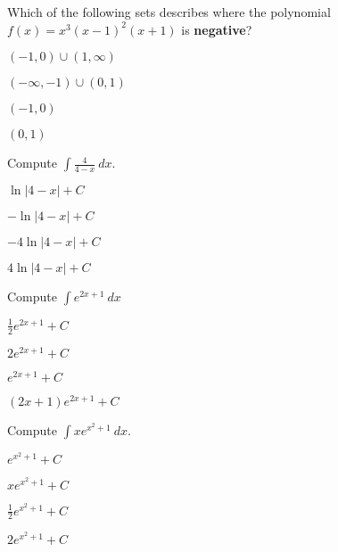 \begin{readinessAssuranceTest}
\setcounter{enumi}{10}

\item Which of the following sets describes where the polynomial \(f(x)=x^3(x-1)^2(x+1)\) is \textbf{negative}?
\begin{multicols}{4}
\begin{readinessAssuranceTestChoices}
\item \((-1,0) \cup (1,\infty) \)
\item \((-\infty,-1) \cup (0,1) \)
\item \((-1,0)\) %
\item \((0,1)\)
\end{readinessAssuranceTestChoices}
\end{multicols}
\vfill

\item
Compute \( \int \frac{4}{4-x}\ dx \).
\begin{multicols}{4}
\begin{readinessAssuranceTestChoices}
\item \(\ln|4-x|+C\)
\item \(-\ln|4-x|+C\)
\item \(-4\ln|4-x|+C\) %
\item \(4\ln|4-x|+C\)
\end{readinessAssuranceTestChoices}
\end{multicols}

\vfill
\item
Compute \(\int e^{2x+1}\ dx\)
\begin{multicols}{4}
\begin{readinessAssuranceTestChoices}
\item \( \frac{1}{2} e^{2x+1}+C\) %
\item \(2e^{2x+1}+C \)
\item \(e^{2x+1}+C\)
\item \( (2x+1)e^{2x+1}+C\)
\end{readinessAssuranceTestChoices}
\end{multicols}

\vfill
\item Compute \(\int x e^{x^2+1}\ dx\).
\begin{multicols}{4}
\begin{readinessAssuranceTestChoices}
\item \(e^{x^2+1}+C\)
\item \(xe^{x^2+1}+C\)
\item \(\frac{1}{2} e^{x^2+1}+C\) %
\item \(2 e^{x^2+1}+C\) 
\end{readinessAssuranceTestChoices}
\end{multicols}



\end{readinessAssuranceTest}
